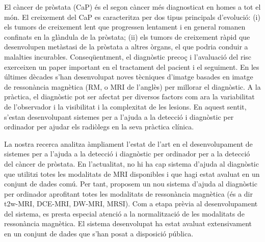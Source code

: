 \begin{abstractCatalan}

El c\`ancer de pr\`ostata (CaP) \'es el segon c\`ancer m\'es diagnosticat en homes a tot el m\'on.
El creixement del CaP es caracteritza per dos tipus principals d'evoluci\'o: (i) els tumors de creixement lent que progressen lentament i en general romanen confinats en la gl\`andula de la pr\`ostata; (ii) els tumors de creixement r\`apid que desenvolupen met\`astasi de la pr\`ostata a altres \`organs, el que podria conduir a malalties incurables.
Conseq\"uentment, el diagn\`ostic preco\c{c} i l'avaluaci\'o del risc exerceixen un paper important en el tractament del pacient i el seguiment.
En les \'ultimes d\`ecades s'han desenvolupat noves t\`ecniques d'imatge basades en imatge de resson\`ancia magn\`etica (RM, o MRI de l'angl\`es) per millorar el diagn\`ostic.
A la pr\`actica, el diagn\`ostic pot ser afectat per diversos factors com ara la variabilitat de l'observador i la visibilitat i la complexitat de les lesions.
En aquest sentit, s'estan desenvolupant sistemes per a l'ajuda a la detecci\'o i diagn\`ostic per ordinador per ajudar els radi\`olegs en la seva pr\`actica cl\'inica.

La nostra recerca analitza \`ampliament l'estat de l'art en el desenvolupament de sistemes per a l'ajuda a la detecci\'o i diagn\`ostic per ordinador per a la detecci\'o del c\`ancer de pr\`ostata.
En l'actualitat, no hi ha cap sistema d'ajuda al diagn\`ostic que utilitzi totes les modalitats de MRI disponibles i que hagi estat avaluat en un conjunt de dades com\'u.
Per tant, proposem un nou sistema d'ajuda al diagn\`ostic per ordinador aprofitant totes les modalitats de resson\`ancia magn\`etica (\'es a dir \acs*{t2w}-MRI, DCE-MRI, DW-MRI, MRSI).
Com a etapa pr\`evia al desenvolupament del sistema, es presta especial atenci\'o a la normalitzaci\'o de les modalitats de resson\`ancia magn\`etica.
El sistema desenvolupat ha estat avaluat extensivament en un conjunt de dades que s'han posat a disposici\'o p\'ublica.
 
\end{abstractCatalan}

